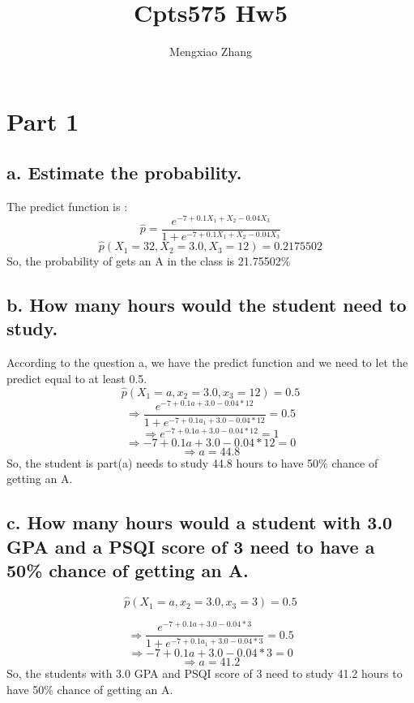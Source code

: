 \documentclass[]{article}
\title{Cpts575 Hw5}
\author{Mengxiao Zhang}
\date{}
\begin{document}
\maketitle

\hypertarget{part-1}{%
\section{Part 1}\label{part-1}}

\hypertarget{a.-estimate-the-probability.}{%
\subsection{a. Estimate the
probability.}\label{a.-estimate-the-probability.}}

The predict function is :
\[\hat{p}=\frac{e^{-7+0.1X_1+X_2-0.04X_3}}{1+e^{-7+0.1X_1+X_2-0.04X_3}}\]
\[\hat{p}(X_1=32,X_2=3.0,X_3=12)=0.2175502\] So, the probability of gets
an A in the class is 21.75502\%

\hypertarget{b.-how-many-hours-would-the-student-need-to-study.}{%
\subsection{b. How many hours would the student need to
study.}\label{b.-how-many-hours-would-the-student-need-to-study.}}

According to the question a, we have the predict function and we need to
let the predict equal to at least 0.5.
\[\hat{p}(X_1=a, x_2=3.0, x_3=12)=0.5\]
\[\Rightarrow\frac{e^{-7+0.1a+3.0-0.04*12}}{1+e^{-7+0.1a_1+3.0-0.04*12}} = 0.5\]
\[\Rightarrow e^{-7+0.1a+3.0-0.04*12} = 1\]
\[\Rightarrow -7+0.1a+3.0-0.04*12 = 0\] \[\Rightarrow a = 44.8\] So, the
student is part(a) needs to study 44.8 hours to have 50\% chance of
getting an A.

\hypertarget{c.-how-many-hours-would-a-student-with-3.0-gpa-and-a-psqi-score-of-3-need-to-have-a-50-chance-of-getting-an-a.}{%
\subsection{c. How many hours would a student with 3.0 GPA and a PSQI
score of 3 need to have a 50\% chance of getting an
A.}\label{c.-how-many-hours-would-a-student-with-3.0-gpa-and-a-psqi-score-of-3-need-to-have-a-50-chance-of-getting-an-a.}}

\[\hat{p}(X_1=a, x_2=3.0, x_3=3)=0.5\]

\[\Rightarrow\frac{e^{-7+0.1a+3.0-0.04*3}}{1+e^{-7+0.1a_1+3.0-0.04*3}} = 0.5\]
\[\Rightarrow -7+0.1a+3.0-0.04*3 = 0\] \[\Rightarrow a = 41.2\] So, the
students with 3.0 GPA and PSQI score of 3 need to study 41.2 hours to
have 50\% chance of getting an A.
\end{document}
